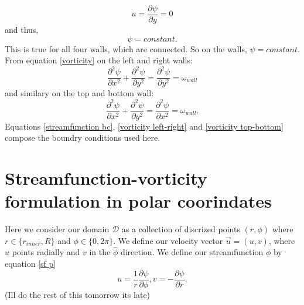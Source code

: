 \documentclass{article}
\begin{document}
\begin{equation}
	u = \frac{\partial \psi}{\partial y} = 0
\end{equation}
and thus,
\begin{equation}
	\psi = constant.
	\label{streamfunction bc}
\end{equation}
This is true for all four walls, which are connected. So on the walls, $\psi = constant$.
From equation \ref{vorticity} on the left and right walls:
\begin{equation}
	\frac{\partial^2 \psi}{\partial x^2} + \frac{\partial^2 \psi}{\partial y^2} = \frac{\partial^2 \psi}{\partial y^2}= \omega_{wall}
	\label{vorticity left-right}
\end{equation}
and similary on the top and bottom wall:
\begin{equation}
	\frac{\partial^2 \psi}{\partial x^2} + \frac{\partial^2 \psi}{\partial y^2} = \frac{\partial^2 \psi}{\partial x^2}= \omega_{wall}.
	\label{vorticity top-bottom}
\end{equation}
Equations \ref{streamfunction bc}, \ref{vorticity left-right} and \ref{vorticity top-bottom} compose the boundry conditions used here.


\section*{Streamfunction-vorticity formulation in polar coorindates}
Here we consider our domain $\mathcal{D}$ as a collection of discrized points $(r, \phi)$ where $r\in \{ r_{inner}, R\}$ and $\phi \in \{ 0, 2 \pi\}$. We define our velocity vector $\vec{u} = (u,v)$, where $u$ points radially and $v$ in the $\hat{\phi}$ direction. We define our streamfunction $\phi$ by equation \ref{sf p}
\begin{equation}
	u = \frac{1}{r} \frac{\partial \psi}{\partial \phi}, v = - \frac{\partial \psi}{\partial r}.
	\label{sf p}
\end{equation}
(Ill do the rest of this tomorrow its late)



 






 
\end{document}
